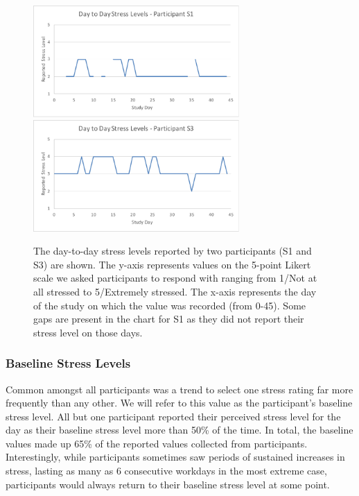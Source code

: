 \begin{figure}[h!]
  \centering
      \includegraphics[width=0.7\textwidth]{s1_stress.pdf}
      \includegraphics[width=0.7\textwidth]{s3_stress.pdf}
  \caption{The day-to-day stress levels reported by two participants (S1 and S3) are shown. The y-axis represents values on the 5-point Likert scale we asked participants to respond with ranging from 1/Not at all stressed to 5/Extremely stressed. The x-axis represents the day of the study on which the value was recorded (from 0-45). Some gaps are present in the chart for S1 as they did not report their stress level on those days.}
   \vspace*{-2mm}
   \label{fig:dailyStress}
\end{figure}


\subsubsection{Baseline Stress Levels}
Common amongst all participants was a trend to select one stress rating
far more frequently than any other. We will refer to this value as the
participant's baseline stress level. All but one participant reported
their perceived stress level for the day as their baseline stress
level more than 50\% of the time. In total, the baseline values made
up 65\% of the reported values collected from
participants. Interestingly, while participants sometimes saw periods
of sustained increases in stress, lasting as many as 6 consecutive
workdays in the most extreme case, participants would always return to
their baseline stress level at some point.



